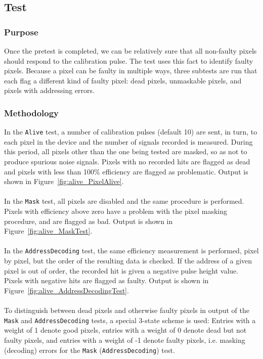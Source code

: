 
\newpage

\subsection{\alivetest Test}
\label{ss:alive}

\subsubsection{Purpose}

Once the pretest is completed, we can be relatively sure that all non-faulty pixels should respond to the calibration pulse.
The \alivetest test uses this fact to identify faulty pixels.
Because a pixel can be faulty in multiple ways, three subtests are run that each flag a different kind of faulty pixel:
dead pixels, unmaskable pixels, and pixels with addressing errors.

\subsubsection{Methodology}

In the {\tt Alive} test, a number of calibration pulses (default 10) are sent, in turn,
to each pixel in the device and the number of signals recorded is measured.
During this period, all pixels other than the one being tested are masked, so as not to produce spurious noise signals.
Pixels with no recorded hits are flagged as dead and pixels with less than 100\% efficiency are flagged as problematic.
Output is shown in Figure~\ref{fig:alive_PixelAlive}.
\\\\
In the {\tt Mask} test, all pixels are disabled and the same procedure is performed.
Pixels with efficiency above zero have a problem with the pixel masking procedure, and are flagged as bad.
Output is shown in Figure~\ref{fig:alive_MaskTest}.
\\\\
In the {\tt AddressDecoding} test, the same efficiency measurement is performed, pixel by pixel,
but the order of the resulting data is checked.
If the address of a given pixel is out of order, the recorded hit is given a negative pulse height value.
Pixels with negative hits are flagged as faulty.
Output is shown in Figure~\ref{fig:alive_AddressDecodingTest}.
\\\\
To distinguish between dead pixels and otherwise faulty pixels in output of the {\tt Mask} and {\tt AddressDecoding} tests, 
a special 3-state scheme is used:  
Entries with a weight of 1 denote good pixels,
entries with a weight of 0 denote dead but not faulty pixels,
and entries with a weight of -1 denote faulty pixels, i.e. masking (decoding) errors for the {\tt Mask} ({\tt AddressDecoding}) test.

